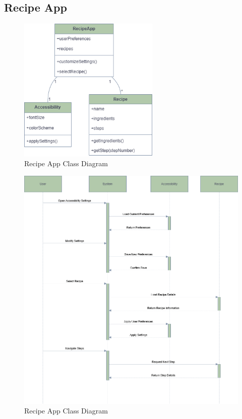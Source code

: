 \documentclass[]{project_interim}
\begin{document}
\newpage

\subsection{Recipe App}

\begin{figure}[ht!]
  \centering
  \includegraphics[width=0.6\textwidth]{Recipe App Class Diagram.png}
  \vspace*{0.0cm}
  \caption{Recipe App Class Diagram}
  \label{fig:1}
\end{figure}
\newpage
\begin{figure}[ht!]
  \centering
  \includegraphics[width=\textwidth]{Recipe App Sequence Diagram.png}
  \vspace*{0.0cm}
  \caption{Recipe App Class Diagram}
  \label{fig:1}
\end{figure}
\end{document}
